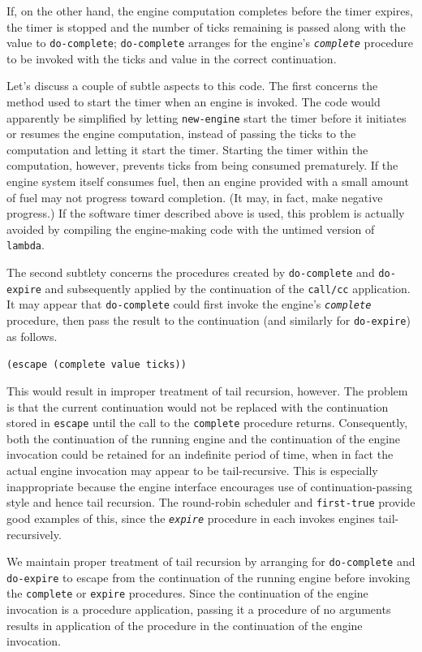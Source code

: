 If, on the other hand, the engine computation completes before
the timer expires, the timer is stopped and the number of ticks remaining
is passed along with the value to \texttt{do-complete};
\texttt{do-complete} arranges for the engine's \texttt{\textit{complete}} procedure
to be invoked with the ticks and value in the correct continuation.


Let's discuss a couple of subtle aspects to this code.
The first concerns the method used to start the timer when an engine
is invoked.
The code would apparently be simplified by letting \texttt{new-engine} start
the timer before it initiates or resumes the engine computation, instead
of passing the ticks to the computation and letting it start the timer.
Starting the timer within the computation, however, prevents ticks from
being consumed prematurely.
If the engine system itself consumes fuel, then an engine provided with a
small amount of fuel may not progress toward completion.
(It may, in fact, make negative progress.)
If the software timer described above is used, this problem is actually
avoided by compiling the engine-making code with the untimed version of
\texttt{lambda}.


The second subtlety concerns the procedures created by \texttt{do-complete} and
\texttt{do-expire} and subsequently applied by the continuation of the
\label{examples_s99}\label{examples_s100}\texttt{call/cc} application.
It may appear that \texttt{do-complete} could first invoke the engine's
\texttt{\textit{complete}} procedure, then pass the result to the continuation
(and similarly for \texttt{do-expire}) as follows.


\texttt{(escape (complete value ticks))}

This would result in improper treatment of tail recursion, however.
The problem is that the current continuation would not be replaced with the
continuation stored in \texttt{escape} until the call to the \texttt{complete}
procedure returns.
Consequently, both the continuation of the running engine and the continuation
of the engine invocation could be retained for an indefinite period of time,
when in fact the actual engine invocation may appear to be tail-recursive.
This is especially inappropriate because the engine interface encourages use of
continuation-passing style and hence tail recursion.
The round-robin scheduler and \texttt{first-true} provide good examples of this,
since the \texttt{\textit{expire}} procedure in each invokes engines tail-recursively.


We maintain proper treatment of tail recursion by arranging for
\texttt{do-complete} and \texttt{do-expire} to escape from
the continuation of the running engine before invoking the \texttt{complete} or
\texttt{expire} procedures.
Since the continuation of the engine invocation is a procedure application,
passing it a procedure of no arguments results in application of the procedure
in the continuation of the engine invocation.


